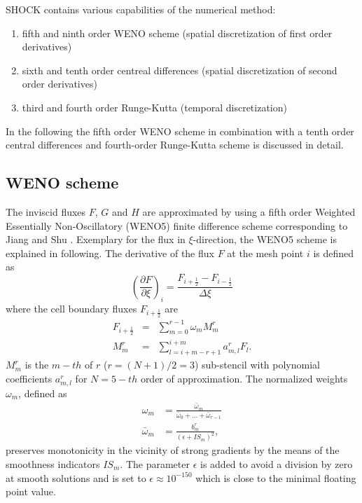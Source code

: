 SHOCK contains various capabilities of the numerical method: 
\begin{enumerate}
\item fifth and ninth order WENO scheme (spatial discretization of first order derivatives)
\item sixth and tenth order centreal differences (spatial discretization of second order derivatives)
\item third and fourth order Runge-Kutta (temporal discretization)
\end{enumerate}
In the following the fifth order WENO scheme in combination with a tenth order central differences and fourth-order Runge-Kutta scheme is discussed in detail.

\subsection{WENO scheme}
The inviscid fluxes $F$, $G$ and $H$ are approximated by using a fifth order Weighted Essentially Non-Oscillatory (WENO5) finite difference scheme corresponding to Jiang and Shu \cite{Jiang1996}.
Exemplary for the flux in $\xi$-direction, the WENO5 scheme is explained in following.
The derivative of the flux $F$ at the mesh point $i$ is defined as
\begin{equation}
\left( \frac{\partial F}{\partial \xi} \right)_i =\frac{F_{i+ \frac{1}{2}} -F_{i-\frac{1}{2}}}{\varDelta \xi}
\end{equation}
where the cell boundary fluxes $F_{i + \frac{1}{2}}$ are
\begin{eqnarray}
F_{i + \frac{1}{2}} & =& \sum_{m=0}^{r-1} \omega_m M^r_m
\\ \nonumber
M^r_m & =& \sum_{l=i+m-r+1}^{i+m} a^r_{m,l} F_{l}.
\label{eq:eq4}
\end{eqnarray}
$M^r_m$ is the $m-th$ of $r$ ($r=(N+1)/2=3$) sub-stencil with polynomial coefficients $a^r_{m,l}$ for $N=5-th$ order of approximation.
The normalized weights $\omega_m$, defined as
\begin{eqnarray}
\label{eq:omega}
\omega_m &= \frac{\bar{\omega}_m}{\bar{\omega}_0+...+\bar{\omega}_{r-1}}
\\ \nonumber
\bar{\omega}_m &= \frac{b_m^r}{\left(\epsilon+IS_m\right)^2},
\end{eqnarray}
preserves monotonicity in the vicinity of strong gradients by the means of the smoothness indicators $IS_m$.
The parameter $\epsilon$ is added to avoid a division by zero at smooth solutions and is set to $\epsilon \approx 10^{-150}$ which is close to the minimal floating point value.
